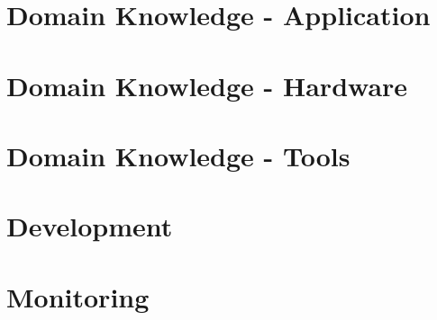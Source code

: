 \documentclass[10pt,a4paper,bibliography=totoc]{scrbook}
\begin{document}
    
   

\tableofcontents
\newpage

\listoffigures
\newpage

\listofcodes
\cleardoublepage

%

\newpage


  
  
  
\part{Domain Knowledge - Application}  

  

\part{Domain Knowledge - Hardware}  

  
  
  

  

\part{Domain Knowledge - Tools}  

  

  


\part{Development}

  


\part{Monitoring}
\end{document}
